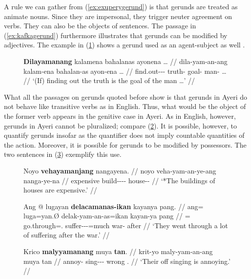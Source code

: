 A rule we can gather from (\ref{ex:exuperygerund}) is that gerunds are treated
as animate nouns. Since they are impersonal, they trigger neuter agreement on
verbs. They can also be the objects of sentences. The passage in
(\ref{ex:kafkagerund}) furthermore illustrates that gerunds can be modified by
adjectives. The example in (\ref{ex:scimethgerund}) shows a gerund used as an
agent-subject as well \citep{benung:scientificmethod}.

\begin{figure}[h]
\ex\label{ex:scimethgerund}\begingl
	\gla \textbf{Dilayamanang} kalamena bahalanas ayonena … //
	\glb dila-yam-an-ang kalam-ena bahalan-as ayon-ena … //
	\glc find.out-\Ptcp{}-\Nmlz{}-\Aarg{} truth-\Gen{} goal-\Parg{} 
		man-\Gen{} … //
	\glft `(If) finding out the truth is the goal of the man …' //
\endgl\xe
\end{figure}

What all the passages on gerunds quoted before show is that gerunds in Ayeri do
not behave like transitive verbs as in English. Thus, what would be the object
of the former verb appears in the genitive case in Ayeri. As in English,
however, gerunds in Ayeri cannot be pluralized; compare (\ref{ex:grndplur}). It
is possible, however, to quantify gerunds insofar as the quantifier does not
imply countable quantities of the action. Moreover, it is possible for gerunds
to be modified by possessors. The two sentences in (\ref{ex:grndmod}) exemplify
this use.

\begin{figure}[h]
\ex\label{ex:grndplur}\ljudge*\begingl
	\gla Noyo \textbf{vehayamanjang} nangayena. //
	\glb noyo veha-yam-an-ye-ang nanga-ye-na //
	\glc expensive build-\Ptcp{}-\Nmlz{}-\Pl{}-\Aarg{} house-\Pl{}-\Gen{} //
	\glft `*The buildings of houses are expensive.' //
\endgl\xe
\end{figure}

\begin{figure}[h]
\pex\label{ex:grndmod}
\a\begingl
	\gla Ang @ lugayan \textbf{delacamanas-ikan} kayanya pang. //
	\glb ang= luga=yan.Ø delak-yam-an-as=ikan kayan-ya pang //
	\glc \AgtT{}= go.through=\TplM{}.\Top{} 
		suffer-\Ptcp{}-\Nmlz{}-\Parg{}=much war-\Loc{} after //
	\glft `They went through a lot of suffering after the war.' //
\endgl

\a\begingl
	\gla Krico \textbf{malyyamanang} muya \textbf{tan}. //
	\glb krit-yo maly-yam-an-ang muya tan //
	\glc annoy-\TsgN{} sing-\Ptcp{}-\Nmlz{}-\Aarg{} wrong \TplM{}.\Gen{} //
	\glft `Their off singing is annoying.' //
\endgl
\xe
\end{figure}

